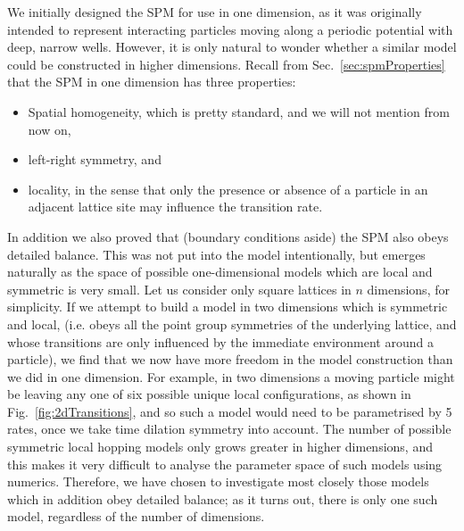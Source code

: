 We initially designed the SPM for use in one dimension, as it was originally intended to represent interacting particles moving along a periodic potential with deep, narrow wells. However, it is only natural to wonder whether a similar
model could be constructed in higher dimensions. Recall from Sec.~\ref{sec:spmProperties}
that the SPM in one dimension has three properties:
\begin{itemize}
 \item Spatial homogeneity, which is pretty standard, and we will not mention from now on,
 \item left-right symmetry, and
 \item locality, in the sense that only the presence or absence of a particle in an adjacent lattice site may influence the transition rate.
\end{itemize}
In addition we also proved that (boundary conditions aside) the SPM also obeys detailed balance. This was not put into the model intentionally, but emerges naturally as the space of possible one-dimensional
models which are local and symmetric is very small.
Let us consider only square lattices in $n$ dimensions, for simplicity. If we attempt to build a model in two dimensions which is symmetric and local, (i.e. obeys all the point group symmetries of the underlying lattice, and whose transitions
are only influenced by the immediate environment around a particle), we find that we now have more freedom in the model construction than we did in one dimension. For example, in two dimensions a moving particle might be leaving
any one of six possible unique local configurations, as shown in Fig.~\ref{fig:2dTransitions}, and so such a model would need to be parametrised by 5 rates, once we take time dilation symmetry into account. The number of possible
symmetric local hopping models only grows greater in higher dimensions, and this makes it very difficult to analyse the parameter space of such models using numerics. Therefore, we have chosen to investigate most closely those models
which in addition obey detailed balance; as it turns out, there is only one such model, regardless of the number of dimensions.
